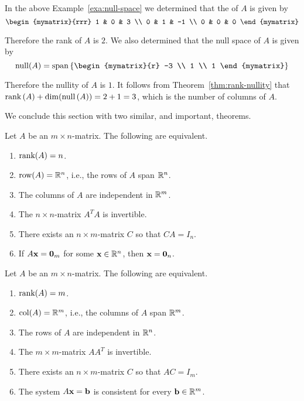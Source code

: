 \medskip
\begin{solution}
In the above Example~\ref{exa:null-space} we determined that the {\rref} of $A$ is given by 
\[
\begin{mymatrix}{rrr}
1 & 0 & 3 \\ 
0 & 1 & -1  \\
0 & 0 & 0 
\end{mymatrix}
\]

Therefore the rank of $A$ is $2$. We also determined that the null space of $A$ is given by 
\[
\func{null} (A) = \sspan \set{\begin{mymatrix}{r}
-3 \\ 
1 \\ 
1
\end{mymatrix}
}
\]

Therefore the nullity of $A$ is $1$. It follows from Theorem~\ref{thm:rank-nullity} that $\mbox{\rm rank}\left(A\right) + \dim( \mbox{\rm null}\left(A\right)) = 2 + 1 = 3$, which is the number of columns of $A$.
\end{solution} 

We conclude this section with two similar, and important, theorems.

\begin{theorem}{}{}
Let $A$ be an $m\times n$-matrix.
The following are equivalent.
\begin{enumerate}
\item $\mbox{\rm rank}(A)=n$.
\item $\mbox{\rm row}(A)=\mathbb{R}^n$, i.e., the rows of $A$ span $\mathbb{R}^n$.
\item The columns of $A$ are independent in $\mathbb{R}^m$.
\item The $n\times n$-matrix $A^TA$ is invertible.
\item There exists an $n\times m$-matrix $C$ so that $CA=I_n$.
\item If $A\mbox{\bf x}=\mbox{\bf 0}_m$ for some $\mbox{\bf x}\in\mathbb{R}^n$,
then $\mbox{\bf x}=\mbox{\bf 0}_n$.
\end{enumerate}
\end{theorem}

\begin{theorem}{}{}
Let $A$ be an $m\times n$-matrix.
The following are equivalent.
\begin{enumerate}
\item $\mbox{\rm rank}(A)=m$.
\item $\mbox{\rm col}(A)=\mathbb{R}^m$, i.e., the columns of $A$ span $\mathbb{R}^m$.
\item The rows of $A$ are independent in $\mathbb{R}^n$.
\item The $m\times m$-matrix $AA^T$ is invertible.
\item There exists an $n\times m$-matrix $C$ so that $AC=I_m$.
\item The system $A\mbox{\bf x}=\mbox{\bf b}$ is consistent for
every $\mbox{\bf b}\in\mathbb{R}^m$.
\end{enumerate}
\end{theorem}
